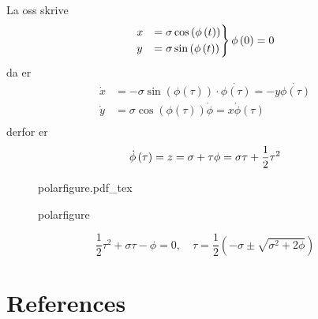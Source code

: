 \documentclass{article}
\newcommand{\incfig}[2][1]{%
\def\svgwidth{#1\columnwidth}
{#2.pdf_tex} } \pdfsuppresswarningpagegroup=1
\theoremstyle{remark}
\newcommand{\newpara}
  {
  \vskip 0.4cm
  }
\begin{document}
  \newpara
  La oss skrive \[
  \begin{split}
    \begin{rcases}
    x &= \sigma  \cos \left( \phi \left( t \right) \right) \\
    y &=  \sigma \sin \left( \phi \left( t \right) \right) \\
    \end{rcases}
    \phi \left( 0 \right) = 0
  \end{split} 
  \] 
  da er \[
  \begin{split}
    \dot{x} &=  -\sigma \sin \left( \phi \left( \tau  \right) \right) \cdot \dot{\phi \left( \tau  \right)} = -y \dot{\phi \left( \tau  \right)} \\
    \dot{y} &= \sigma  \cos \left( \phi \left( \tau  \right) \right) \dot{\phi } = x \dot{\phi }\left( \tau  \right) \\
  \end{split} 
  \] 
  derfor er \[
    \dot{\phi } \left( \tau  \right) =  z = \sigma + \tau \\
    \phi = \sigma \tau  + \frac{1}{2} \tau ^2
  \] 

\begin{figure}[ht]
    \centering
    \incfig{polarfigure}
    \caption{polarfigure}
    \label{fig:polarfigure}
\end{figure}

   \[
   \frac{1}{2} \tau ^2 +  \sigma  \tau  - \phi = 0, \quad \tau = \frac{1}{2} \left( -\sigma \pm\sqrt{\sigma ^2 + 2\phi }  \right) 
   \] 







 \newpage

\section{References}%
\label{sec:references}





\end{document}
